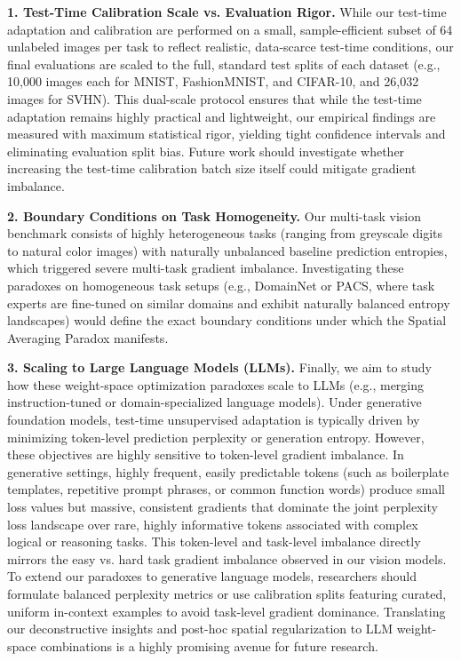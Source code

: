 \textbf{1. Test-Time Calibration Scale vs. Evaluation Rigor.}
While our test-time adaptation and calibration are performed on a small, sample-efficient subset of 64 unlabeled images per task to reflect realistic, data-scarce test-time conditions, our final evaluations are scaled to the full, standard test splits of each dataset (e.g., 10,000 images each for MNIST, FashionMNIST, and CIFAR-10, and 26,032 images for SVHN). This dual-scale protocol ensures that while the test-time adaptation remains highly practical and lightweight, our empirical findings are measured with maximum statistical rigor, yielding tight confidence intervals and eliminating evaluation split bias. Future work should investigate whether increasing the test-time calibration batch size itself could mitigate gradient imbalance.

\textbf{2. Boundary Conditions on Task Homogeneity.}
Our multi-task vision benchmark consists of highly heterogeneous tasks (ranging from greyscale digits to natural color images) with naturally unbalanced baseline prediction entropies, which triggered severe multi-task gradient imbalance. Investigating these paradoxes on homogeneous task setups (e.g., DomainNet or PACS, where task experts are fine-tuned on similar domains and exhibit naturally balanced entropy landscapes) would define the exact boundary conditions under which the Spatial Averaging Paradox manifests.

\textbf{3. Scaling to Large Language Models (LLMs).}
Finally, we aim to study how these weight-space optimization paradoxes scale to LLMs (e.g., merging instruction-tuned or domain-specialized language models). Under generative foundation models, test-time unsupervised adaptation is typically driven by minimizing token-level prediction perplexity or generation entropy. However, these objectives are highly sensitive to token-level gradient imbalance. In generative settings, highly frequent, easily predictable tokens (such as boilerplate templates, repetitive prompt phrases, or common function words) produce small loss values but massive, consistent gradients that dominate the joint perplexity loss landscape over rare, highly informative tokens associated with complex logical or reasoning tasks. This token-level and task-level imbalance directly mirrors the easy vs. hard task gradient imbalance observed in our vision models. To extend our paradoxes to generative language models, researchers should formulate balanced perplexity metrics or use calibration splits featuring curated, uniform in-context examples to avoid task-level gradient dominance. Translating our deconstructive insights and post-hoc spatial regularization to LLM weight-space combinations is a highly promising avenue for future research.

